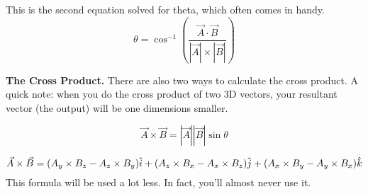 This is the second equation solved for theta, which often comes in handy.
\begin{equation}
    \theta = \cos^{-1} \left( {\frac{\vec{A} \cdot \vec{B}}{|\vec{A}| \times |\vec{B}|}} \right)
\end{equation}

\noindent \textbf{The Cross Product.}
There are also two ways to calculate the cross product. A quick note: when you do the cross product of two 3D vectors, your resultant vector (the
output) will be one dimensions smaller. 

\begin{equation}
    \vec{A} \times \vec{B} = |\vec{A}||\vec{B}| \sin \theta
\end{equation}

\begin{equation}
    \vec{A} \times \vec{B} = (A_y \times B_z - A_z \times B_y)\hat{i} + (A_z \times B_x - A_x \times B_z)\hat{j} + (A_x \times B_y - A_y \times B_x)\hat{k} \\
\end{equation}
This formula will be used a lot less. In fact, you'll almost never use it.